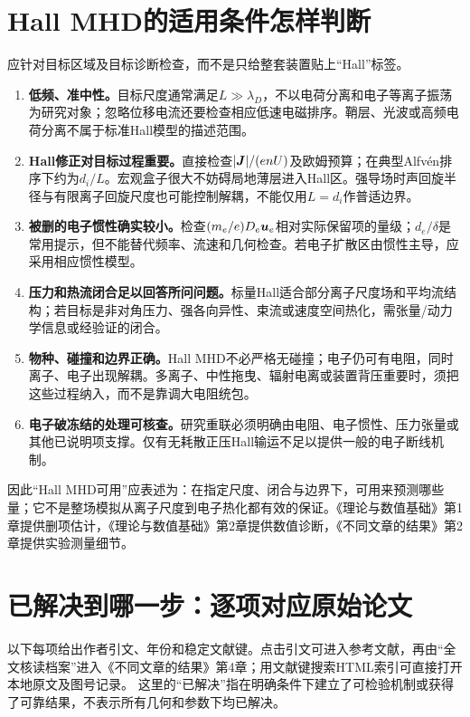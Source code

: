 \documentclass[UTF8,a4paper,11pt,openany,fontset=fandol]{ctexbook}
\begin{document}
\section{Hall MHD的适用条件怎样判断}
应针对目标区域及目标诊断检查，而不是只给整套装置贴上“Hall”标签。
\begin{enumerate}
\item \textbf{低频、准中性。}目标尺度通常满足$L\gg\lambda_D$，不以电荷分离和电子等离子振荡为研究对象；忽略位移电流还要检查相应低速电磁排序。鞘层、光波或高频电荷分离不属于标准Hall模型的描述范围。
\item \textbf{Hall修正对目标过程重要。}直接检查$|\bm{J}|/(enU)$及欧姆预算；在典型Alfvén排序下约为$d_i/L$。宏观盒子很大不妨碍局地薄层进入Hall区。强导场时声回旋半径与有限离子回旋尺度也可能控制解耦，不能仅用$L=d_i$作普适边界。
\item \textbf{被删的电子惯性确实较小。}检查$(m_e/e)D_e\bm{u}_e$相对实际保留项的量级；$d_e/\delta$是常用提示，但不能替代频率、流速和几何检查。若电子扩散区由惯性主导，应采用相应惯性模型。
\item \textbf{压力和热流闭合足以回答所问问题。}标量Hall适合部分离子尺度场和平均流结构；若目标是非对角压力、强各向异性、束流或速度空间热化，需张量/动力学信息或经验证的闭合。
\item \textbf{物种、碰撞和边界正确。}Hall MHD不必严格无碰撞；电子仍可有电阻，同时离子、电子出现解耦。多离子、中性拖曳、辐射电离或装置背压重要时，须把这些过程纳入，而不是靠调大电阻统包。
\item \textbf{电子破冻结的处理可核查。}研究重联必须明确由电阻、电子惯性、压力张量或其他已说明项支撑。仅有无耗散正压Hall输运不足以提供一般的电子断线机制。
\end{enumerate}
因此“Hall MHD可用”应表述为：在指定尺度、闭合与边界下，可用来预测哪些量；它不是整场模拟从离子尺度到电子热化都有效的保证。《理论与数值基础》第1章提供删项估计，《理论与数值基础》第2章提供数值诊断，《不同文章的结果》第2章提供实验测量细节。

\section{已解决到哪一步：逐项对应原始论文}
\label{sec:guide-solved}
以下每项给出作者引文、年份和稳定文献键。点击引文可进入参考文献，再由“全文核读档案”进入《不同文章的结果》第4章；用文献键搜索HTML索引可直接打开本地原文及图号记录。
这里的“已解决”指在明确条件下建立了可检验机制或获得了可靠结果，不表示所有几何和参数下均已解决。
\end{document}
